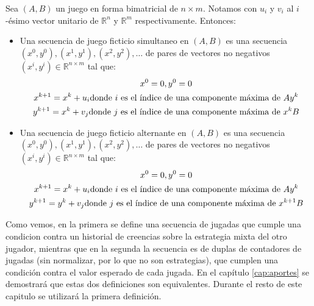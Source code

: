 \begin{definition} \label{def:fp:brandt}
    Sea $(A, B)$ un juego en forma bimatricial de $n \times m$. Notamos con $u_i$ y $v_i$ al $i$-ésimo vector unitario de $\mathbb{R}^n$ y $\mathbb{R}^m$ respectivamente. Entonces:
    \begin{itemize}
        \item Una secuencia de juego ficticio simultaneo en $(A, B)$ es una secuencia $(x^0, y^0), (x^1, y^1), (x^2, y^2), \dots$ de pares de vectores no negativos $(x^i, y^i) \in \mathbb{R}^{n \times m}$ tal que:
        \begin{gather}
            x^0 = \boldmath{0}, y^0 = \boldmath{0} \\
            x^{k+1} = x^{k} + u_i \text{donde $i$ es el índice de una componente máxima de $Ay^k$} \\
            y^{k+1} = x^{k} + v_j \text{donde $j$ es el índice de una componente máxima de $x^kB$}
        \end{gather}
        \item Una secuencia de juego ficticio alternante en $(A, B)$ es una secuencia $(x^0, y^0), (x^1, y^1), (x^2, y^2), \dots$ de pares de vectores no negativos $(x^i, y^i) \in \mathbb{R}^{n \times m}$ tal que:
        \begin{gather}
            x^0 = \boldmath{0}, y^0 = \boldmath{0} \\
            x^{k+1} = x^{k} + u_i \text{donde $i$ es el índice de una componente máxima de $Ay^k$} \\
            y^{k+1} = y^{k} + v_j \text{donde $j$ es el índice de una componente máxima de $x^{k+1}B$}
        \end{gather}
    \end{itemize}
\end{definition}

Como vemos, en la primera se define una secuencia de jugadas que cumple una condicion contra un historial de creencias sobre la estrategia mixta del otro jugador, mientras que en la segunda la secuencia es de duplas de contadores de jugadas (sin normalizar, por lo que no son estrategias), que cumplen una condición contra el valor esperado de cada jugada. En el capítulo \ref{cap:aportes} se demostrará que estas dos definiciones son equivalentes. Durante el resto de este capitulo se utilizará la primera definición.





